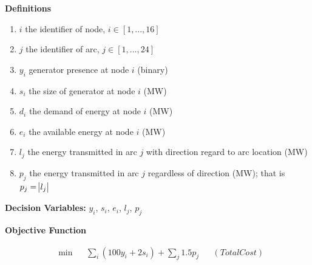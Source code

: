 \textbf{Definitions}\par
\begin{enumerate}
\item $i$ the identifier of node, $i \in [1,...,16]$
\item $j$ the identifier of arc, $j \in [1,...,24]$
\item $y_i$ generator presence at node $i$ (binary)
\item $s_i$ the size of generator at node $i$ (MW)
\item $d_i$ the demand of energy at node $i$ (MW)
\item $e_i$ the available energy at node $i$ (MW)
\item $l_j$ the energy transmitted in arc $j$ with direction regard to arc location (MW)
\item $p_j$ the energy transmitted in arc $j$ regardless of direction (MW); that is $p_j = \abs{l_j}$
\end{enumerate}

\textbf{Decision Variables:} $y_i$, $s_i$, $e_i$, $l_j$, $p_j$

\textbf{Objective Function}\par
\begin{align*}
&\min && \sum_i (100 y_i + 2s_i) + \sum_j 1.5p_j && (Total Cost)\\
\end{align*}

